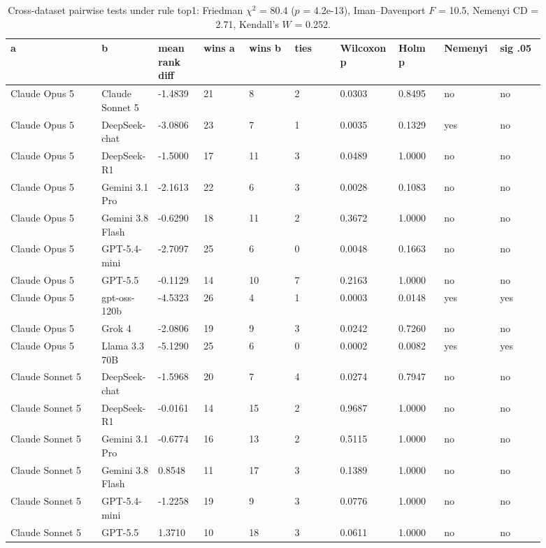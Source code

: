 \begin{landscape}
\tiny
\setlength{\tabcolsep}{3pt}
\begin{longtable}{p{0.162\linewidth}p{0.081\linewidth}p{0.081\linewidth}p{0.081\linewidth}p{0.081\linewidth}p{0.081\linewidth}p{0.081\linewidth}p{0.081\linewidth}p{0.081\linewidth}p{0.081\linewidth}}
\caption{Cross-dataset pairwise tests under rule top1: Friedman $\chi^2$ = 80.4 ($p$ = 4.2e-13), Iman--Davenport $F$ = 10.5, Nemenyi CD = 2.71, Kendall's $W$ = 0.252.}\label{tab:pairwise_top1}\\
\toprule
a & b & mean rank diff & wins a & wins b & ties & Wilcoxon p & Holm p & Nemenyi & sig .05 \\
\midrule
Claude Opus 5 & Claude Sonnet 5 & -1.4839 & 21 & 8 & 2 & 0.0303 & 0.8495 & no & no \\
Claude Opus 5 & DeepSeek-chat & -3.0806 & 23 & 7 & 1 & 0.0035 & 0.1329 & yes & no \\
Claude Opus 5 & DeepSeek-R1 & -1.5000 & 17 & 11 & 3 & 0.0489 & 1.0000 & no & no \\
Claude Opus 5 & Gemini 3.1 Pro & -2.1613 & 22 & 6 & 3 & 0.0028 & 0.1083 & no & no \\
Claude Opus 5 & Gemini 3.8 Flash & -0.6290 & 18 & 11 & 2 & 0.3672 & 1.0000 & no & no \\
Claude Opus 5 & GPT-5.4-mini & -2.7097 & 25 & 6 & 0 & 0.0048 & 0.1663 & no & no \\
Claude Opus 5 & GPT-5.5 & -0.1129 & 14 & 10 & 7 & 0.2163 & 1.0000 & no & no \\
Claude Opus 5 & gpt-oss-120b & -4.5323 & 26 & 4 & 1 & 0.0003 & 0.0148 & yes & yes \\
Claude Opus 5 & Grok 4 & -2.0806 & 19 & 9 & 3 & 0.0242 & 0.7260 & no & no \\
Claude Opus 5 & Llama 3.3 70B & -5.1290 & 25 & 6 & 0 & 0.0002 & 0.0082 & yes & yes \\
Claude Sonnet 5 & DeepSeek-chat & -1.5968 & 20 & 7 & 4 & 0.0274 & 0.7947 & no & no \\
Claude Sonnet 5 & DeepSeek-R1 & -0.0161 & 14 & 15 & 2 & 0.9687 & 1.0000 & no & no \\
Claude Sonnet 5 & Gemini 3.1 Pro & -0.6774 & 16 & 13 & 2 & 0.5115 & 1.0000 & no & no \\
Claude Sonnet 5 & Gemini 3.8 Flash & 0.8548 & 11 & 17 & 3 & 0.1389 & 1.0000 & no & no \\
Claude Sonnet 5 & GPT-5.4-mini & -1.2258 & 19 & 9 & 3 & 0.0776 & 1.0000 & no & no \\
Claude Sonnet 5 & GPT-5.5 & 1.3710 & 10 & 18 & 3 & 0.0611 & 1.0000 & no & no \\

\end{longtable}
\end{landscape}
